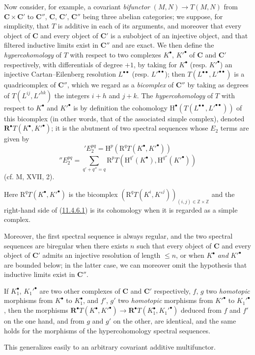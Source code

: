 \begin{env}[11.4.6]
\label{0.11.4.6}
Now consider, for example, a covariant \emph{bifunctor}
$(M,N)\to T(M,N)$ from $\boldsymbol{C}\times\boldsymbol{C}'$ to $\boldsymbol{C}''$,
$\boldsymbol{C}$, $\boldsymbol{C}'$, $\boldsymbol{C}''$ being three abelian
categories; we suppose, for simplicity, that $T$ is additive in each of its
arguments, and moreover that every object of $\boldsymbol{C}$ and every object of
$\boldsymbol{C}'$ is a subobject of an injective object, and that filtered inductive
limits exist in $\boldsymbol{C}''$ and are exact. We then define
the \emph{hypercohomology} of $T$ with respect to two complexes
$K^\bullet$, $K'^\bullet$ of $\boldsymbol{C}$ and $\boldsymbol{C}'$ respectively, with
differentials of degree $+1$, by taking for $K^\bullet$ (resp.
$K'^\bullet$) an injective Cartan--Eilenberg resolution
$L^{\bullet\bullet}$ (resp. $L'^{\bullet\bullet}$); then
$T(L^{\bullet\bullet},L'^{\bullet\bullet})$ is a quadricomplex of
$\boldsymbol{C}''$, which we regard as a \emph{bicomplex} of $\boldsymbol{C}''$
by taking as degrees of $T(L^{ij},L'^{hk})$ the integers $i+h$ and $j+k$.
The \emph{hypercohomology} of $T$ with respect to $K^\bullet$ and $K'^\bullet$
is by definition the cohomology
$\mathrm H^\bullet(T(L^{\bullet\bullet},L'^{\bullet\bullet}))$ of this
bicomplex (in other words, that of the associated simple complex), denoted
$\mathbf R^\bullet T(K^\bullet,K'^\bullet)$; it is the abutment of
two spectral sequences whose $E_2$ terms are given by
\[
  \label{0.11.4.6.1}
  'E_2^{pq}=\mathrm H^p(\mathrm R^qT(K^\bullet,K'^\bullet))
  \tag{11.4.6.1}
\]
\[
  \label{0.11.4.6.2}
  ''E_2^{pq}=\sum_{q'+q''=q}
  \mathrm R^pT(\mathrm H^{q'}(K^\bullet),\mathrm H^{q''}(K'^\bullet))
  \tag{11.4.6.2}
\]
(cf. M, XVII, 2).

Here $\mathrm R^qT(K^\bullet,K'^\bullet)$ is the bicomplex
$(\mathrm R^qT(K^i,K'^j))_{(i,j)\in\mathbb Z\times\mathbb Z}$ and the
right-hand side of (\hyperref[0.11.4.6.1]{11.4.6.1}) is its cohomology when it is
regarded as a simple complex.

Moreover, the first spectral sequence is always regular, and the two
spectral sequences are biregular when there exists $n$ such that every object of
$\boldsymbol{C}$ and every object of $\boldsymbol{C}'$ admits an injective resolution
of length $\leq n$, or when $K^\bullet$ \emph{and} $K'^\bullet$ are bounded
below; in the latter case, we can moreover omit the hypothesis that
inductive limits exist in $\boldsymbol{C}''$.

If $K_1^\bullet$, $K_1'^\bullet$ are two other complexes of $\boldsymbol{C}$ and
$\boldsymbol{C}'$ respectively, $f$, $g$ two \emph{homotopic} morphisms from
$K^\bullet$ to $K_1^\bullet$, and $f'$, $g'$ two \emph{homotopic} morphisms from
$K'^\bullet$ to $K_1'^\bullet$, then the morphisms
$\mathbf R^\bullet T(K^\bullet,K'^\bullet)\to
\mathbf R^\bullet T(K_1^\bullet,K_1'^\bullet)$ deduced from $f$ and $f'$ on the one
hand, and from $g$ and $g'$ on the other, are identical, and the same holds for
the morphisms of the hypercohomology spectral sequences.

This generalizes easily to an arbitrary covariant additive multifunctor.
\end{env}

